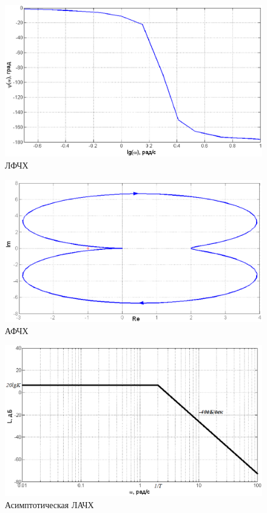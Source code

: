 \documentclass[12pt,a4paper]{article}
\begin{document}
\begin{figure}[H]
	\centering
	\includegraphics[width=1\linewidth]{LFCHH1.eps}
	\caption{ЛФЧХ}
\end{figure}
\begin{figure}[H]
	\centering
	\includegraphics[width=1\linewidth]{AFCHH1.eps}
	\caption{АФЧХ}
\end{figure}
\begin{figure}[H]
	\centering
	\includegraphics[width=1\linewidth]{L1.eps}
	\caption{Асимптотическая ЛАЧХ}
\end{figure}
\end{document}
